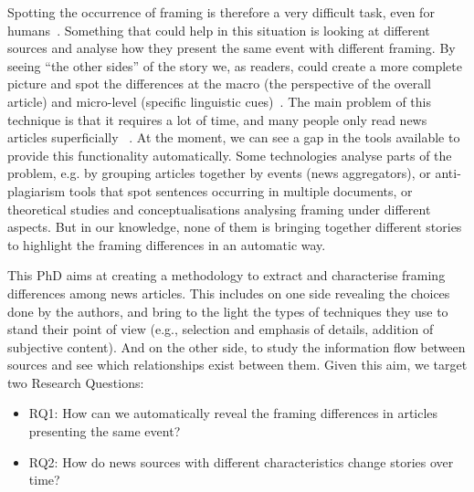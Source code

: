 Spotting the occurrence of framing is therefore a very difficult task, even for humans~\cite{morstatter2018identifying}. Something that could help in this situation is looking at different sources and analyse how they present the same event with different framing.
By seeing ``the other sides'' of the story we, as readers, could create a more complete picture and spot the differences at the macro (the perspective of the overall article) and micro-level (specific linguistic cues)~\cite{gamson1989media}.
The main problem of this technique is that it requires a lot of time,
and many people only read news articles superficially%
~\cite{pennycook2019lazy}.
At the moment, we can see a gap in the tools available to provide this functionality automatically.
Some technologies analyse parts of the problem, e.g. by grouping articles together by events (news aggregators), or anti-plagiarism tools that spot sentences occurring in multiple documents, or theoretical studies and conceptualisations analysing framing under different aspects.
But in our knowledge, none of them is bringing together different stories to highlight the framing differences in an automatic way.



This PhD aims at creating a methodology to extract and characterise framing differences among news articles.
This includes on one side revealing the choices done by the authors, and bring to the light the types of techniques they use to stand their point of view (e.g., selection and emphasis of details, addition of subjective content).
And on the other side, to study the information flow between sources and see which relationships exist between them. %
Given this aim, we target two Research Questions:

\begin{itemize}
    \item RQ1: How can we automatically reveal the framing differences in articles presenting the same event?
    \item RQ2: How do news sources with different characteristics change stories over time?
\end{itemize}

